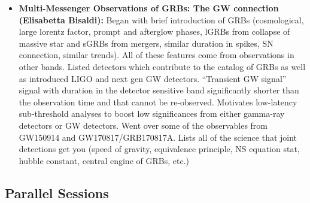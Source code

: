 \begin{itemize}
    \item \textbf{ Multi-Messenger Observations of GRBs: The GW connection (Elisabetta Bisaldi):} Began with brief introduction of GRBs (cosmological, large lorentz factor, prompt and afterglow phases, lGRBs from collapse of massive star and sGRBs from mergers, similar duration in spikes, SN connection, similar trends). All of these features come from observations in other bands. Listed detectors which contribute to the catalog of GRBs as well as introduced LIGO and next gen GW detectors. ``Transient GW signal'' signal with duration in the detector sensitive band significantly shorter than the observation time and that cannot be re-observed. Motivates low-latency sub-threshold analyses to boost low significances from either gamma-ray detectors or GW detectors. Went over some of the observables from GW150914 and GW170817/GRB170817A. Lists all of the science that joint detections get you (speed of gravity, equivalence principle, NS equation stat, hubble constant, central engine of GRBs, etc.)
\end{itemize}

\subsection{Parallel Sessions}

